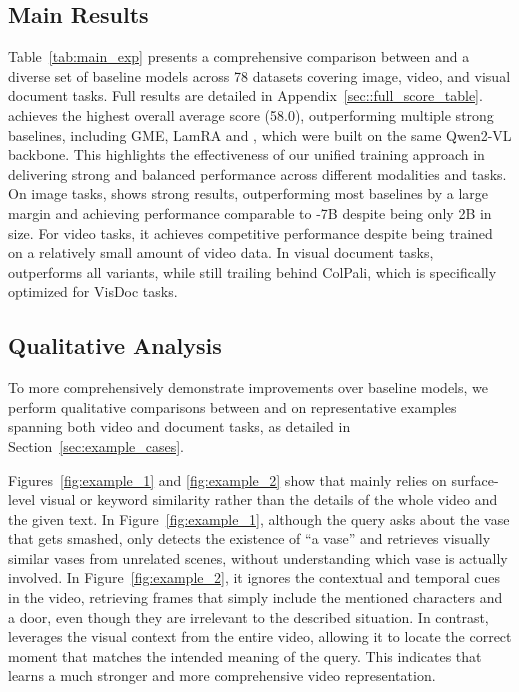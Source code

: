 \subsection{Main Results}    


Table~\ref{tab:main_exp} presents a comprehensive comparison between \model and a diverse set of baseline models across 78 datasets covering image, video, and visual document tasks. Full results are detailed in Appendix~\ref{sec::full_score_table}. \model achieves the highest overall average score (58.0), outperforming multiple strong baselines, including GME, LamRA and \vlmvec, which were built on the same Qwen2-VL backbone. This highlights the effectiveness of our unified training approach in delivering strong and balanced performance across different modalities and tasks. 
On image tasks, \model shows strong results, outperforming most baselines by a large margin and achieving performance comparable to \vlmvec-7B despite being only 2B in size. For video tasks, it achieves competitive performance despite being trained on a relatively small amount of video data. In visual document tasks, \model outperforms all \vlmvec variants, while still trailing behind ColPali, which is specifically optimized for VisDoc tasks.



\subsection{Qualitative Analysis}
To more comprehensively demonstrate improvements over baseline models, we perform qualitative comparisons between \model and \vlmvec on representative examples spanning both video and document tasks, as detailed in Section~\ref{sec:example_cases}. 

Figures~\ref{fig:example_1} and \ref{fig:example_2} show that \vlmvec mainly relies on surface-level visual or keyword similarity rather than the details of the whole video and the given text. In Figure~\ref{fig:example_1}, although the query asks about the vase that gets smashed, \vlmvec only detects the existence of ``a vase'' and retrieves visually similar vases from unrelated scenes, without understanding which vase is actually involved. In Figure~\ref{fig:example_2}, it ignores the contextual and temporal cues in the video, retrieving frames that simply include the mentioned characters and a door, even though they are irrelevant to the described situation. In contrast, \model leverages the visual context from the entire video, allowing it to locate the correct moment that matches the intended meaning of the query. This indicates that \model learns a much stronger and more comprehensive video representation.


